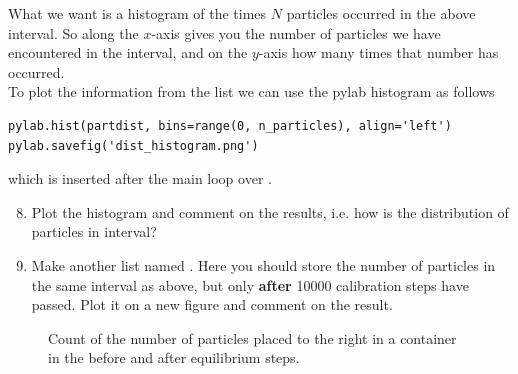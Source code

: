 \documentclass{article}
\begin{document}
What we want is a histogram of the times $N$ particles occurred in the above
interval. So along the $x$-axis gives you the number of particles we have
encountered in the interval, and on the $y$-axis how many times that number
has occurred.\\

To plot the information from the list we can use the pylab histogram as follows

\begin{lstlisting}
pylab.hist(partdist, bins=range(0, n_particles), align='left')
pylab.savefig('dist_histogram.png')
\end{lstlisting}

which is inserted after the main loop over .

\begin{enumerate}
  \setcounter{enumi}{7}
  \item Plot the histogram and comment on the results, i.e. how is the
    distribution of particles in interval?

  \item Make another list named . Here you should store the
    number of particles in the same interval as above, but only {\bf after}
    10000 calibration steps have passed. Plot it on a new figure and comment
    on the result.

\end{enumerate}

\begin{figure}[htb]
  \label{fig:partdist}
  \caption{
     Count of the number of particles placed to the right in a container in the
     before and after equilibrium steps.
  }
\end{figure}



\end{document}
